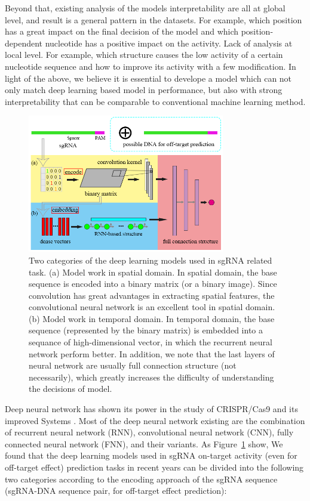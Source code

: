 \documentclass{bioinfo}
\begin{document}
 Beyond that, existing analysis of the models interpretability are all at global level, and result is a general pattern in the datasets. 
For example, which position has a great impact on the final decision of the model and which position-dependent nucleotide has a positive impact on the activity. 
Lack of analysis at local level. 
For example, which structure causes the low activity of a certain nucleotide sequence and how to improve its activity with a few modification. 
In light of the above, we believe it is essential to develope a model which can not only match deep learning based model in performance, 
but also with strong interpretability that can be comparable to conventional machine learning method.


\begin{figure}[!tpb]%
    \centerline{\includegraphics[width=86mm]{NEWcategory.png}}
    \caption{Two categories of the deep learning models used in sgRNA related task. 
    (a) Model work in spatial domain. 
    In spatial domain, the base sequence is encoded into a binary matrix (or a binary image). 
    Since convolution has great advantages in extracting spatial features, the convolutional neural network is an excellent tool in spatial domain. 
    (b) Model work in temporal domain. 
    In temporal domain, the base sequence (represented by the binary matrix) is embedded into a sequance of high-dimensional vector, 
    in which the recurrent neural network perform better.
    In addition, we note that the last layers of neural network are usually full connection structure (not necessarily), 
    which greatly increases the difficulty of understanding the decisions of model.
    }\label{fig:category}
\end{figure}

Deep neural network has shown its power in the study of CRISPR/Cas9 and its improved Systems \citep{liu2019computational}. 
 Most of the deep neural network existing are the combination of recurrent neural network (RNN), convolutional neural network (CNN), fully connected neural network (FNN), and their variants. 
 As Figure~\ref{fig:category} show,  
 We found that the deep learning models used in sgRNA on-target activity (even for off-target effect) prediction tasks in recent years can be divided into the following two categories according to the encoding approach of the sgRNA sequence (sgRNA-DNA sequence pair, for off-target effect prediction):
\end{document}
